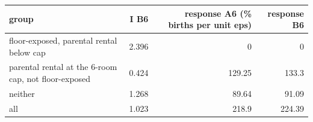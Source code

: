 \begin{tabular}{lrrr}
\toprule
group & I B6 & response A6 (\% births per unit eps) & response B6 \\
\midrule
floor-exposed, parental rental below cap & 2.396 & 0 & 0 \\
parental rental at the 6-room cap, not floor-exposed & 0.424 & 129.25 & 133.3 \\
neither & 1.268 & 89.64 & 91.09 \\
all & 1.023 & 218.9 & 224.39 \\
\bottomrule
\end{tabular}
